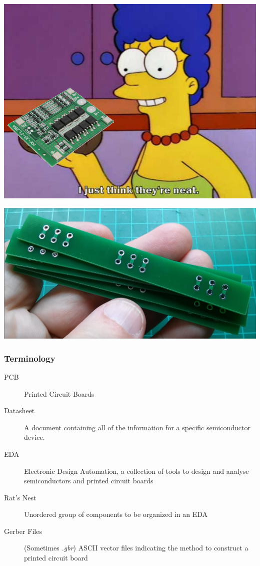 \documentclass[]{beamer}
\begin{document}
\begin{frame}[plain]
    \includegraphics[width=0.85\paperwidth,keepaspectratio]{images/i_think_neat.png}
\end{frame}

\begin{frame}[plain]
    \includegraphics[width=0.85\paperwidth,keepaspectratio]{images/board-to-board.png}
\end{frame}

\begin{frame}
    \frametitle{Terminology}
    \begin{description}
        \item[PCB]{Printed Circuit Boards}
        \item[Datasheet]{A document containing all of the information for a
            specific semiconductor device.}
        \item[EDA]{Electronic Design Automation, a collection of tools to design
            and analyse semiconductors and printed circuit boards}
        \item[Rat's Nest]{Unordered group of components to be organized in an EDA}
        \item[Gerber Files]{(Sometimes \emph{.gbr}) ASCII vector files
            indicating the method to construct a printed circuit board}
    \end{description}
\end{frame}
\end{document}
